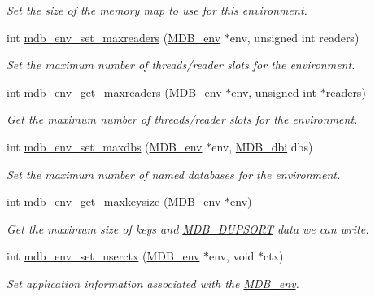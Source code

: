 \begin{DoxyCompactItemize}
\begin{DoxyCompactList}\small\item\em Set the size of the memory map to use for this environment. \end{DoxyCompactList}\item 
int \mbox{\hyperlink{group__mdb_gae687966c24b790630be2a41573fe40e2}{mdb\+\_\+env\+\_\+set\+\_\+maxreaders}} (\mbox{\hyperlink{struct_m_d_b__env}{M\+D\+B\+\_\+env}} $\ast$env, unsigned int readers)
\begin{DoxyCompactList}\small\item\em Set the maximum number of threads/reader slots for the environment. \end{DoxyCompactList}\item 
int \mbox{\hyperlink{group__mdb_ga70e143cf11760d869f754c9c9956e6cc}{mdb\+\_\+env\+\_\+get\+\_\+maxreaders}} (\mbox{\hyperlink{struct_m_d_b__env}{M\+D\+B\+\_\+env}} $\ast$env, unsigned int $\ast$readers)
\begin{DoxyCompactList}\small\item\em Get the maximum number of threads/reader slots for the environment. \end{DoxyCompactList}\item 
int \mbox{\hyperlink{group__mdb_gaa2fc2f1f37cb1115e733b62cab2fcdbc}{mdb\+\_\+env\+\_\+set\+\_\+maxdbs}} (\mbox{\hyperlink{struct_m_d_b__env}{M\+D\+B\+\_\+env}} $\ast$env, \mbox{\hyperlink{group__mdb_gadbe68a06c448dfb62da16443d251a78b}{M\+D\+B\+\_\+dbi}} dbs)
\begin{DoxyCompactList}\small\item\em Set the maximum number of named databases for the environment. \end{DoxyCompactList}\item 
int \mbox{\hyperlink{group__mdb_gaaf0be004f33828bf2fb09d77eb3cef94}{mdb\+\_\+env\+\_\+get\+\_\+maxkeysize}} (\mbox{\hyperlink{struct_m_d_b__env}{M\+D\+B\+\_\+env}} $\ast$env)
\begin{DoxyCompactList}\small\item\em Get the maximum size of keys and \mbox{\hyperlink{group__mdb__dbi__open_gae0626566c2562e9007f5c8c9535bab1a}{M\+D\+B\+\_\+\+D\+U\+P\+S\+O\+RT}} data we can write. \end{DoxyCompactList}\item 
int \mbox{\hyperlink{group__mdb_gaf2fe09eb9c96eeb915a76bf713eecc46}{mdb\+\_\+env\+\_\+set\+\_\+userctx}} (\mbox{\hyperlink{struct_m_d_b__env}{M\+D\+B\+\_\+env}} $\ast$env, void $\ast$ctx)
\begin{DoxyCompactList}\small\item\em Set application information associated with the \mbox{\hyperlink{struct_m_d_b__env}{M\+D\+B\+\_\+env}}. \end{DoxyCompactList}\item 

\end{DoxyCompactItemize}
